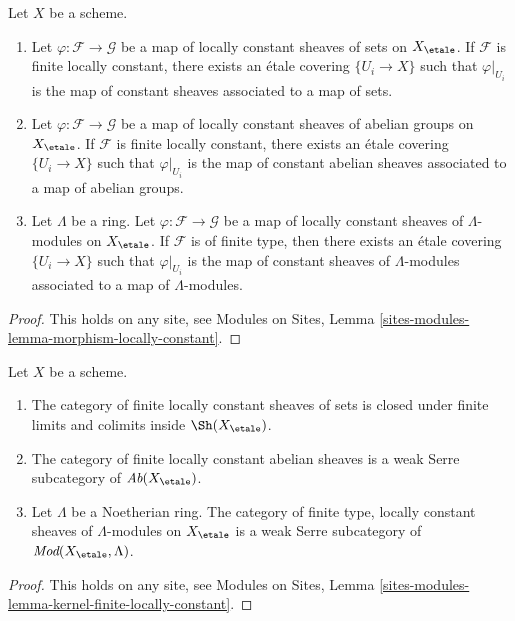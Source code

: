\begin{lemma}
\label{lemma-morphism-locally-constant}
Let $X$ be a scheme.
\begin{enumerate}
\item Let $\varphi : \mathcal{F} \to \mathcal{G}$ be a map
of locally constant sheaves of sets on $X_\etale$.
If $\mathcal{F}$ is finite locally constant, there exists an
\'etale covering $\{U_i \to X\}$ such that
$\varphi|_{U_i}$ is the map of constant sheaves associated to
a map of sets.
\item Let $\varphi : \mathcal{F} \to \mathcal{G}$ be a map
of locally constant sheaves of abelian groups on $X_\etale$.
If $\mathcal{F}$ is finite locally constant, there exists an \'etale
covering $\{U_i \to X\}$ such that $\varphi|_{U_i}$ is the map of
constant abelian sheaves associated to a map of abelian groups.
\item Let $\Lambda$ be a ring.
Let $\varphi : \mathcal{F} \to \mathcal{G}$ be a map
of locally constant sheaves of $\Lambda$-modules on $X_\etale$.
If $\mathcal{F}$ is of finite type, then there exists an \'etale covering
$\{U_i \to X\}$ such that $\varphi|_{U_i}$ is the map of constant
sheaves of $\Lambda$-modules associated to a map of $\Lambda$-modules.
\end{enumerate}
\end{lemma}

\begin{proof}
This holds on any site, see
Modules on Sites, Lemma \ref{sites-modules-lemma-morphism-locally-constant}.
\end{proof}

\begin{lemma}
\label{lemma-kernel-finite-locally-constant}
Let $X$ be a scheme.
\begin{enumerate}
\item The category of finite locally constant sheaves of sets
is closed under finite limits and colimits inside $\Sh(X_\etale)$.
\item The category of finite locally constant abelian sheaves is a
weak Serre subcategory of $\textit{Ab}(X_\etale)$.
\item Let $\Lambda$ be a Noetherian ring. The category of
finite type, locally constant sheaves of $\Lambda$-modules on
$X_\etale$ is a weak Serre subcategory of
$\textit{Mod}(X_\etale, \Lambda)$.
\end{enumerate}
\end{lemma}

\begin{proof}
This holds on any site, see
Modules on Sites, Lemma
\ref{sites-modules-lemma-kernel-finite-locally-constant}.
\end{proof}

